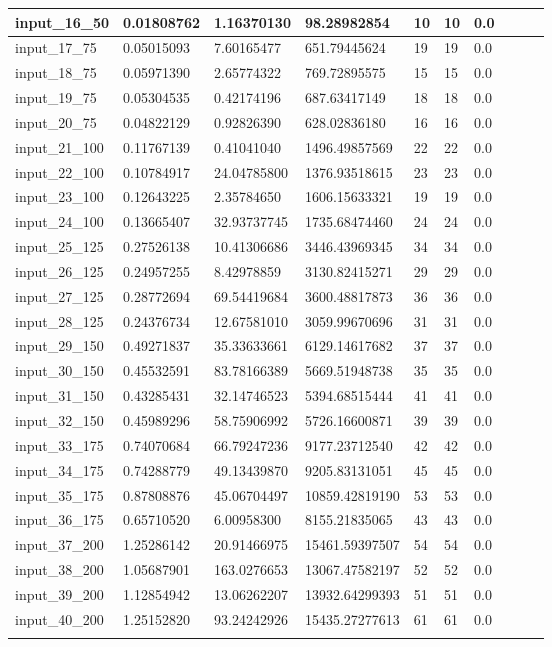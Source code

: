\begin{tabularx}{\textwidth}{*{10}{Y}}
	input\_16\_50	&	0.01808762	&	1.16370130	&	98.28982854		&	10	&	10	 & 0.0	\\\midrule
	input\_17\_75	&	0.05015093	&	7.60165477	&	651.79445624	&	19	&	19	 & 0.0	\\\midrule
	input\_18\_75	&	0.05971390	&	2.65774322	&	769.72895575	&	15	&	15	 & 0.0	\\\midrule
	input\_19\_75	&	0.05304535	&	0.42174196	&	687.63417149	&	18	&	18	 & 0.0	\\\midrule
	input\_20\_75	&	0.04822129	&	0.92826390	&	628.02836180	&	16	&	16	 & 0.0	\\\midrule
	input\_21\_100	&	0.11767139	&	0.41041040	&	1496.49857569	&	22	&	22 & 0.0	\\\midrule
	input\_22\_100	&	0.10784917	&	24.04785800	&	1376.93518615	&	23	&	23 & 0.0	\\\midrule
	input\_23\_100	&	0.12643225	&	2.35784650	&	1606.15633321	&	19	&	19 & 0.0	\\\midrule
	input\_24\_100	&	0.13665407	&	32.93737745	&	1735.68474460	&	24	&	24 & 0.0	\\\midrule
	input\_25\_125	&	0.27526138	&	10.41306686	&	3446.43969345	&	34	&	34 & 0.0	\\\midrule
	input\_26\_125	&	0.24957255	&	8.42978859	&	3130.82415271	&	29	&	29 & 0.0	\\\midrule
	input\_27\_125	&	0.28772694	&	69.54419684	&	3600.48817873	&	36	&	36 & 0.0	\\\midrule
	input\_28\_125	&	0.24376734	&	12.67581010	&	3059.99670696	&	31	&	31 & 0.0	\\\midrule
	input\_29\_150	&	0.49271837	&	35.33633661	&	6129.14617682	&	37	&	37 & 0.0	\\\midrule
	input\_30\_150	&	0.45532591	&	83.78166389	&	5669.51948738	&	35	&	35 & 0.0	\\\midrule
	input\_31\_150	&	0.43285431	&	32.14746523	&	5394.68515444	&	41	&	41 & 0.0	\\\midrule
	input\_32\_150	&	0.45989296	&	58.75906992	&	5726.16600871	&	39	&	39 & 0.0	\\\midrule
	input\_33\_175	&	0.74070684	&	66.79247236	&	9177.23712540	&	42	&	42 & 0.0	\\\midrule
	input\_34\_175	&	0.74288779	&	49.13439870	&	9205.83131051	&	45	&	45 & 0.0	\\\midrule
	input\_35\_175	&	0.87808876	&	45.06704497	&	10859.42819190	&	53	&	53 & 0.0	\\\midrule
	input\_36\_175	&	0.65710520	&	6.00958300	&	8155.21835065	&	43	&	43 & 0.0	\\\midrule
	input\_37\_200	&	1.25286142	&	20.91466975	&	15461.59397507	&	54	&	54 & 0.0	\\\midrule
	input\_38\_200	&	1.05687901	&	163.0276653	&	13067.47582197	&	52	&	52 & 0.0	\\\midrule
	input\_39\_200	&	1.12854942	&	13.06262207	&	13932.64299393	&	51	&	51 & 0.0	\\\midrule
	input\_40\_200	&	1.25152820	&	93.24242926	&	15435.27277613	&	61	&	61 & 0.0 \\\bottomrule
    \caption{Risultati}\label{tab:risultati}
\end{tabularx}

\normalsize